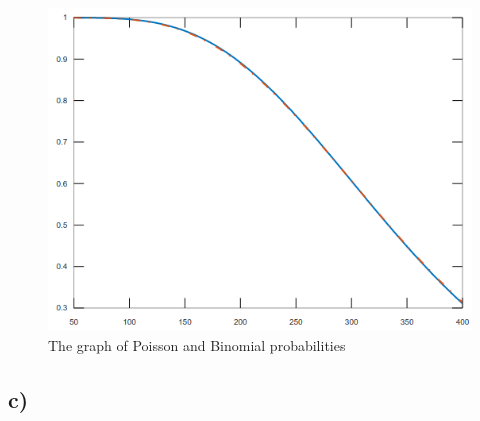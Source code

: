 \documentclass[12pt]{article}
\begin{document}
\begin{figure}[h]
    \centering
    \includegraphics[scale=0.5]{3b_graph}
    \caption{The graph of Poisson and Binomial probabilities}
\end{figure}

\subsection*{c)} 
\end{document}
